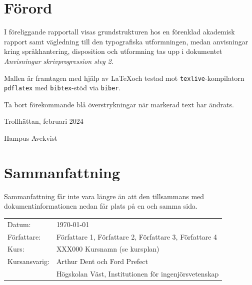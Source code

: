 \documentclass[12pt]{report}
\def\title{Rapportmall IV steg 2}
\def\course{XXX000 Kursnamn (se kursplan)}
\begin{document}


\setcounter{secnumdepth}{0}

\newpage

\thispagestyle{plain}

\section{Förord}
I föreliggande rapportall visas grundstrukturen hos en förenklad akademisk
rapport samt vägledning till den typografiska utformningen, medan anvisningar
kring språkhantering, disposition och utformning tas upp i dokumentet
\textit{Anvisningar skrivprogression steg 2}.

Mallen är framtagen med hjälp av \LaTeX och testad mot 
\verb|texlive|-kompilatorn \verb|pdflatex| med \verb|bibtex|-stöd via
\verb|biber|.

Ta bort förekommande blå överstrykningar när markerad text har ändrats. 

\vspace{1cm}

Trollhättan, februari 2024

Hampus Avekvist

\newpage

\section{Sammanfattning}
Sammanfattning får inte vara längre än att den tillsammans med
dokumentinformationen nedan får plats på en och samma sida. 

\vfill
\begin{table}[ht!]
    \centering
    \begin{tabular}{|l l|}
        \hline
        Datum: &\today \\
        Författare: &Författare 1, Författare 2, Författare 3, Författare 4 \\
        Kurs: &\course \\
        Kursansvarig: &Arthur Dent och Ford Prefect \\
        & Högskolan Väst, Institutionen för ingenjörsvetenskap \\
        \hline
    \end{tabular}
\end{table}

\pagestyle{fancy}
\fancyhf{}
\fancyhead[C]{\title}
\fancyfoot[C]{\thepage}

\setcounter{secnumdepth}{3}
\tableofcontents
\thispagestyle{fancy}
\end{document}
